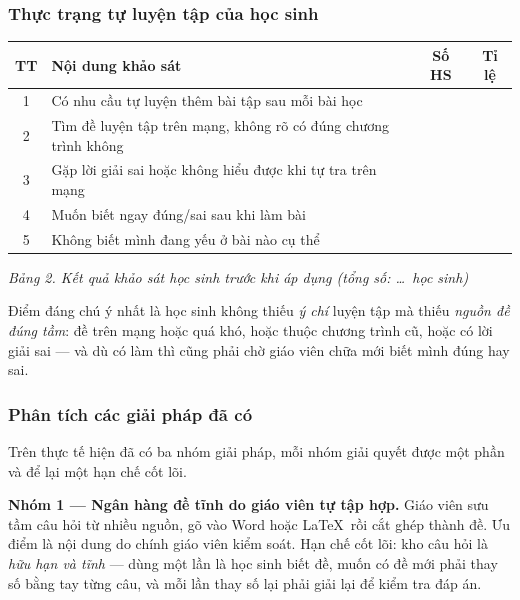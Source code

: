 \subsubsection{Thực trạng tự luyện tập của học sinh}

\begin{center}
\begin{tabular}{|c|p{8.2cm}|c|c|}
\hline
\textbf{TT} & \textbf{Nội dung khảo sát} & \textbf{Số HS} & \textbf{Tỉ lệ} \\ \hline
1 & Có nhu cầu tự luyện thêm bài tập sau mỗi bài học & & \\ \hline
2 & Tìm đề luyện tập trên mạng, không rõ có đúng chương trình không & & \\ \hline
3 & Gặp lời giải sai hoặc không hiểu được khi tự tra trên mạng & & \\ \hline
4 & Muốn biết ngay đúng/sai sau khi làm bài & & \\ \hline
5 & Không biết mình đang yếu ở bài nào cụ thể & & \\ \hline
\end{tabular}
\end{center}
\textit{Bảng 2. Kết quả khảo sát học sinh trước khi áp dụng (tổng số: \dots\ học sinh)}


Điểm đáng chú ý nhất là học sinh không thiếu \textit{ý chí} luyện tập mà thiếu
\textit{nguồn đề đúng tầm}: đề trên mạng hoặc quá khó, hoặc thuộc chương trình
cũ, hoặc có lời giải sai --- và dù có làm thì cũng phải chờ giáo viên chữa mới
biết mình đúng hay sai.

\subsubsection{Phân tích các giải pháp đã có}

Trên thực tế hiện đã có ba nhóm giải pháp, mỗi nhóm giải quyết được một phần và
để lại một hạn chế cốt lõi.

\textbf{Nhóm 1 --- Ngân hàng đề tĩnh do giáo viên tự tập hợp.} Giáo viên sưu tầm
câu hỏi từ nhiều nguồn, gõ vào Word hoặc \LaTeX\ rồi cắt ghép thành đề. Ưu điểm
là nội dung do chính giáo viên kiểm soát. Hạn chế cốt lõi: kho câu hỏi là
\textit{hữu hạn và tĩnh} --- dùng một lần là học sinh biết đề, muốn có đề mới
phải thay số bằng tay từng câu, và mỗi lần thay số lại phải giải lại để kiểm tra
đáp án.

